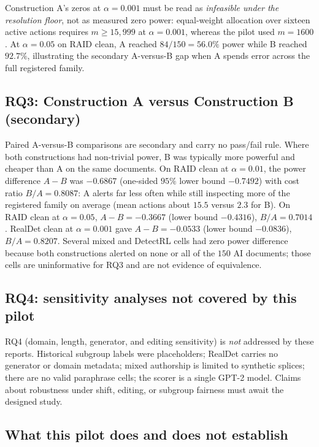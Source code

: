 \documentclass[pdflatex,sn-mathphys-num]{sn-jnl}
\begin{document}
Construction A's zeros at \(\alpha=0.001\) must be read as \emph{infeasible under the resolution floor}, not as measured zero power: equal-weight allocation over sixteen active actions requires \(m\ge 15{,}999\) at \(\alpha=0.001\), whereas the pilot used \(m=1600\). At \(\alpha=0.05\) on RAID clean, A reached \(84/150=56.0\%\) power while B reached \(92.7\%\), illustrating the secondary A-versus-B gap when A spends error across the full registered family.

\subsection{RQ3: Construction A versus Construction B (secondary)}

Paired A-versus-B comparisons are secondary and carry no pass/fail rule. Where both constructions had non-trivial power, B was typically more powerful and cheaper than A on the same documents. On RAID clean at \(\alpha=0.01\), the power difference \(A-B\) was \(-0.6867\) (one-sided \(95\%\) lower bound \(-0.7492\)) with cost ratio \(B/A=0.8087\): A alerts far less often while still inspecting more of the registered family on average (mean actions about \(15.5\) versus \(2.3\) for B). On RAID clean at \(\alpha=0.05\), \(A-B=-0.3667\) (lower bound \(-0.4316\)), \(B/A=0.7014\). RealDet clean at \(\alpha=0.001\) gave \(A-B=-0.0533\) (lower bound \(-0.0836\)), \(B/A=0.8207\). Several mixed and DetectRL cells had zero power difference because both constructions alerted on none or all of the \(150\) AI documents; those cells are uninformative for RQ3 and are not evidence of equivalence.

\subsection{RQ4: sensitivity analyses not covered by this pilot}

RQ4 (domain, length, generator, and editing sensitivity) is \emph{not} addressed by these reports. Historical subgroup labels were placeholders; RealDet carries no generator or domain metadata; mixed authorship is limited to synthetic splices; there are no valid paraphrase cells; the scorer is a single GPT-2 model. Claims about robustness under shift, editing, or subgroup fairness must await the designed study.

\subsection{What this pilot does and does not establish}
\end{document}
